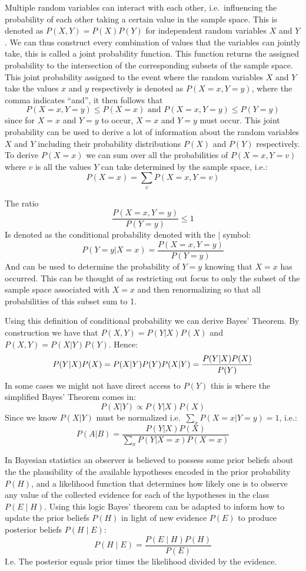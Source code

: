 \documentclass[12pt letter]{report}
\begin{document}
Multiple random variables can interact with each other, i.e.~influencing
the probability of each other taking a certain value in the sample
space. This is denoted as \(P(X, Y) = P(X)P(Y)\) for independent random
variables \(X\) and \(Y\). We can thus construct every combination of
values that the variables can jointly take, this is called a joint
probability function. This function returns the assigned probability to
the intersection of the corresponding subsets of the sample space. This
joint probability assigned to the event where the random variables \(X\)
and \(Y\) take the values \(x\) and \(y\) respectively is denoted as
\(P(X = x, Y = y)\), where the comma indicates ``and'', it then follows
that \[
P (X = x, Y = y) \leq P (X = x) \text{ and } P (X = x, Y = y) \leq P (Y = y)
\] since for \(X = x\) and \(Y = y\) to occur, \(X = x\) and \(Y = y\)
must occur. This joint probability can be used to derive a lot of
information about the random variables \(X\) and \(Y\) including their
probability distributions \(P(X)\) and \(P(Y)\) respectively. To derive
\(P(X = x)\) we can sum over all the probabilities of
\(P(X = x, Y = v)\) where \(v\) is all the values \(Y\) can take
determined by the sample space, i.e.: \[
P(X = x) = \sum_{v} P(X = x, Y = v)
\]

The ratio \[
\frac{P(X = x, Y = y)}{P(Y = y)} \leq 1
\] Is denoted as the conditional probability denoted with the \(|\)
symbol: \[
P(Y = y | X = x) = \frac{P(X = x, Y = y)}{P(Y = y)}
\] And can be used to determine the probability of \(Y = y\) knowing
that \(X = x\) has occurred. This can be thought of as restricting out
focus to only the subset of the sample space associated with \(X = x\)
and then renormalizing so that all probabilities of this subset sum to
1.

Using this definition of conditional probability we can derive Bayes'
Theorem. By construction we have that \(P (X, Y) = P(Y | X) P(X)\) and
\(P(X, Y) = P(X | Y) P (Y)\). Hence: \[
P (Y | X) P(X) = P (X | Y) P (Y) \\
P (X | Y) = \frac{P (Y | X) P(X)}{P(Y)}
\] In some cases we might not have direct access to \(P(Y)\) this is
where the simplified Bayes' Theorem comes in: \[
P (X | Y) \propto P (Y | X) P(X)
\] Since we know \(P(X | Y )\) must be normalized
i.e.~\(\sum_x P(X = x | Y = y) = 1\), i.e.: \[
P (A | B) = \frac{P (Y | X) P (X)}{\sum_x P (Y | X = x) P (X = x)}
\]

In Bayesian statistics an observer is believed to possess some prior
beliefs about the the plausibility of the available hypotheses encoded
in the prior probability \(P(H)\), and a likelihood function that
determines how likely one is to observe any value of the collected
evidence for each of the hypotheses in the class \(P(E \mid H)\). Using
this logic Bayes' theorem can be adapted to inform how to update the
prior beliefs \(P(H)\) in light of new evidence \(P(E)\) to produce
posterior beliefs \(P(H \mid E)\): \[
P (H \mid E) = \frac{P(E \mid H) P(H)}{P(E)}
\] I.e. The posterior equals prior times the likelihood divided by the
evidence.


    
    
    
\end{document}
